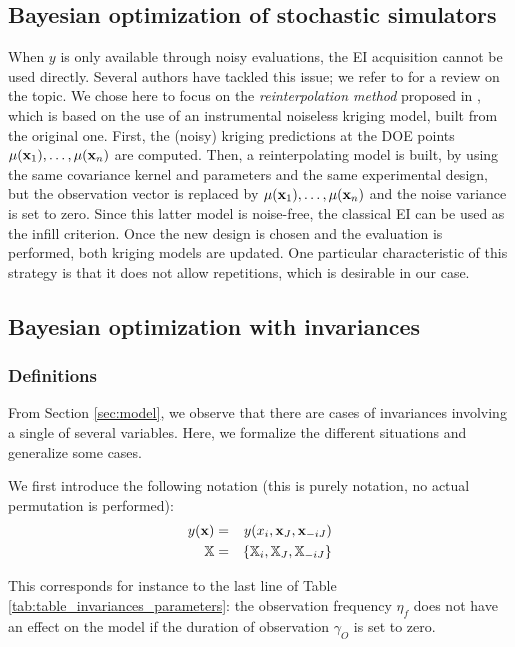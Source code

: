 \subsection{Bayesian optimization of stochastic simulators}
When $y$ is only available through noisy evaluations, the EI acquisition cannot be used directly.
Several authors have tackled this issue; we refer to \cite{picheny2013benchmark} for a review on the topic.
We chose here to focus on the \textit{reinterpolation method} proposed in \cite{forrester2006design}, which is based on the use of an instrumental noiseless kriging model, 
built from the original one. First, the (noisy) kriging predictions at the DOE points $\mu(\mathbf{x}_1), \ldots, \mu(\mathbf{x}_n)$ are computed. 
Then, a reinterpolating model is built, by using the same covariance kernel and parameters and the same experimental design, but
the observation vector is replaced by $\mu(\mathbf{x}_1), \ldots, \mu(\mathbf{x}_n)$ and the noise variance is set to zero. Since this latter model is
noise-free, the classical EI can be used as the infill criterion. Once the new design is chosen and the evaluation is performed,
both kriging models are updated. One particular characteristic of this strategy is that it does not allow repetitions, which is desirable in our
case.

\subsection{Bayesian optimization with invariances}

\subsubsection{Definitions}
From Section \ref{sec:model}, we observe that there are cases of invariances involving a single of several variables. 
Here, we formalize the different situations and generalize some cases.

We first introduce the following notation (this is purely notation, no actual permutation is performed):
\begin{eqnarray}
 y(\mathbf{x}) &=& y(x_i, \mathbf{x}_J, \mathbf{x}_{-iJ})\\
 \mathbb{X} &=& \{\mathbb{X}_i, \mathbb{X}_J, \mathbb{X}_{-iJ} \}
\end{eqnarray}

This corresponds for instance to the last line of Table \ref{tab:table_invariances_parameters}: the observation frequency $\eta_f$ does not have an effect on the model if the duration of observation $\gamma_O$ is set to zero.

